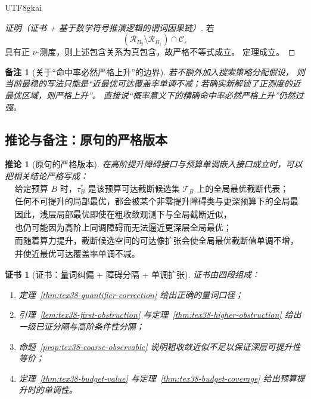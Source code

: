 \documentclass[12pt]{article}
\newtheorem{corollary}{推论}[section]
\newtheorem{remark}{备注}[section]
\newtheorem{Certificate}{证书}[section]
\begin{document}
\begin{CJK*}{UTF8}{gkai}
\begin{proof}[证明（证书 + 基于数学符号推演逻辑的谓词因果链）]
若
\[
  (\mathcal R_{B_2}\setminus\mathcal R_{B_1})\cap\mathcal C_\varepsilon
\]
具有正 $\nu$-测度，则上述包含关系为真包含，故严格不等式成立。
定理成立。
\end{proof}

\begin{remark}[关于“命中率必然严格上升”的边界]
若不额外加入搜索策略分配假设，
则当前最稳的写法只能是“近最优可达覆盖率单调不减；若确实新解锁了正测度的近最优区域，则严格上升”。
直接说“概率意义下的精确命中率必然严格上升”仍然过强。
\end{remark}

\subsection{推论与备注：原句的严格版本}
\label{subsec:tex38-budget-corollary}

\begin{corollary}[原句的严格版本]
\label{cor:tex38-budget-strict}
在高阶提升障碍接口与预算单调嵌入接口成立时，可以把相关结论严格写成：
\[
  \begin{aligned}
    &\text{给定预算 }B\text{ 时，}\tau_B^\ast\text{ 是该预算可达截断候选集 }\mathcal T_B\text{ 上的全局最优截断代表；}\\
    &\text{任何不可提升的局部最优，都会被某个非零提升障碍类与更深预算下的全局最优支路分隔；}\\
    &\text{因此，浅层局部最优即使在粗收敛观测下与全局截断近似，}\\
    &\text{也仍可能因为高阶上同调障碍而无法逼近更深层全局最优；}\\
    &\text{而随着算力提升，截断候选空间的可达像扩张会使全局最优截断值单调不增，}\\
    &\text{并使近最优可达覆盖率单调不减。}
  \end{aligned}
\]
\end{corollary}

\begin{Certificate}[证书：量词纠偏 + 障碍分隔 + 单调扩张]
\label{cert:tex38-budget-strict}
证书由四段组成：
\begin{enumerate}
  \item 定理~\ref{thm:tex38-quantifier-correction} 给出正确的量词口径；
  \item 引理~\ref{lem:tex38-first-obstruction} 与定理~\ref{thm:tex38-higher-obstruction} 给出一级已证分隔与高阶条件性分隔；
  \item 命题~\ref{prop:tex38-coarse-observable} 说明粗收敛近似不足以保证深层可提升性等价；
  \item 定理~\ref{thm:tex38-budget-value} 与定理~\ref{thm:tex38-budget-coverage} 给出预算提升时的单调性。
\end{enumerate}
\end{Certificate}


\end{CJK*}
\end{document}
